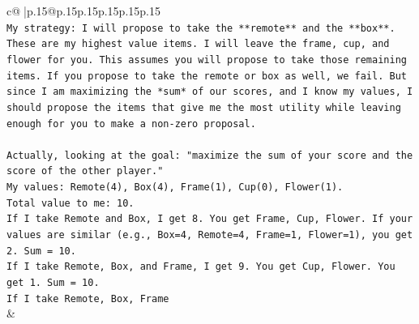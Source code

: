 \documentclass{article}
\begin{document}
{\begin{supertabular}{c@{$\;$}|p{.15\linewidth}@{}p{.15\linewidth}p{.15\linewidth}p{.15\linewidth}p{.15\linewidth}p{.15\linewidth}}
{{{\\ 
\texttt{My strategy: I will propose to take the **remote** and the **box**. These are my highest value items. I will leave the frame, cup, and flower for you. This assumes you will propose to take those remaining items. If you propose to take the remote or box as well, we fail. But since I am maximizing the *sum* of our scores, and I know my values, I should propose the items that give me the most utility while leaving enough for you to make a non{-}zero proposal.} \\
\\ 
\texttt{Actually, looking at the goal: "maximize the sum of your score and the score of the other player."} \\
\texttt{My values: Remote(4), Box(4), Frame(1), Cup(0), Flower(1).} \\
\texttt{Total value to me: 10.} \\
\texttt{If I take Remote and Box, I get 8. You get Frame, Cup, Flower. If your values are similar (e.g., Box=4, Remote=4, Frame=1, Flower=1), you get 2. Sum = 10.} \\
\texttt{If I take Remote, Box, and Frame, I get 9. You get Cup, Flower. You get 1. Sum = 10.} \\
\texttt{If I take Remote, Box, Frame} \\
            }
        }
    }
    & \\ \\


\end{supertabular}}
\end{document}
